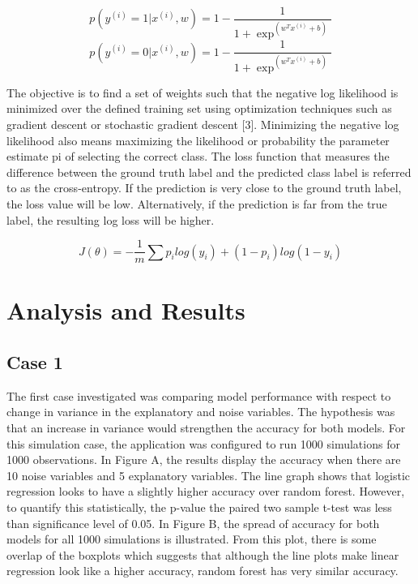 \documentclass{llncs}
\begin{document}
\begin{equation}
p(y^{(i)} = 1 | x^{(i)},w) = 1-  \frac{1}{1+\exp^{(w^{T}x^{(i)}+b)}}
\end{equation}
\begin{equation}
p(y^{(i)} = 0 | x^{(i)},w) = 1-  \frac{1}{1+\exp^{(w^{T}x^{(i)}+b)}}
\end{equation}


The objective is to find a set of weights such that the negative log likelihood is minimized over the defined training set using optimization techniques such as gradient descent or stochastic gradient descent [3]. Minimizing the negative log likelihood also means maximizing the likelihood or probability the parameter estimate pi of selecting the correct class. The loss function that measures the difference between the ground truth label and the predicted class label is referred to as the cross-entropy. If the prediction is very close to the ground truth label, the loss value will be low. Alternatively, if the prediction is far from the true label, the resulting log loss will be higher.

\begin{equation}
J(\theta) = -\frac{1}{m}\sum p_{i}log(y_{i}) + (1-p_{i})log(1-y_{i})
\end{equation}


\section{Analysis and Results}

\subsection{Case 1}

The first case investigated was comparing model performance with respect to change in variance in the explanatory and noise variables. The hypothesis was that an increase in variance would strengthen the accuracy for both models. For this simulation case, the application was configured to run 1000 simulations for 1000 observations. In Figure A, the results display the accuracy when there are 10 noise variables and 5 explanatory variables. The line graph shows that logistic regression looks to have a slightly higher accuracy over random forest.  However, to quantify this statistically, the p-value the paired two sample t-test was less than significance level of 0.05. In Figure B, the spread of accuracy for both models for all 1000 simulations is illustrated. From this plot, there is some overlap of the boxplots which suggests that although the line plots make linear regression look like a higher accuracy, random forest has very similar accuracy.
\end{document}
